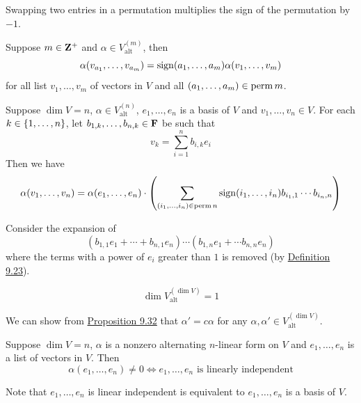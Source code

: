 \documentclass[12pt,a4paper]{article}
\begin{document}
    \begin{prop}
        Swapping two entries in a permutation multiplies the sign of the permutation by $-1$.
    \end{prop}
    \begin{prop}
        Suppose $m\in\mathbf{Z}^+$ and $\alpha\in V_{\mathrm{alt}}^{(m)}$, then
        $$
        \alpha(v_{a_1},\dots,v_{a_m})=\operatorname{sign}(a_1,\dots,a_m)\alpha(v_1,\dots,v_m)
        $$
        for all list $v_1,\dots,v_m$ of vectors in $V$ and all $(a_1,\dots,a_m)\in\operatorname{perm} m$.
    \end{prop}
    \hfill

    \begin{prop}\label{9.32}
        Suppose $\dim V=n$, $\alpha\in V_{\mathrm{alt}}^{(n)}$, $e_1,\dots,e_n$ is a basis of $V$ and $v_1,\dots,v_n\in V$. For each $k\in\left\{1,\dots,n\right\}$, let $b_{1,k},\dots,b_{n,k}\in\mathbf{F}$ be such that 
        $$
        v_k=\sum_{i=1}^nb_{i,k}e_i
        $$
        Then we have
        $$
        \alpha(v_1,\dots,v_n)=\alpha(e_1,\dots,e_n)\cdot\left(\sum_{(i_1,\dots,i_n)\in\operatorname{perm} n}\operatorname{sign}(i_1,\dots,i_n)b_{i_1,1}\cdots b_{i_n,n}\right)
        $$
    \end{prop}
    \begin{remark}
        Consider the expansion of
        $$
        (b_{1,1}e_1+\cdots+b_{n,1}e_n)\cdots(b_{1,n}e_1+\cdots b_{n,n}e_n)
        $$
        where the terms with a power of $e_i$ greater than $1$ is removed (by \hyperref[9.23]{Definition 9.23}).
    \end{remark}
    \hfill

    \begin{prop}
        $$
        \dim V_{\mathrm{alt}}^{(\dim V)}=1
        $$
    \end{prop}
    \begin{remark}
        We can show from \hyperref[9.32]{Proposition 9.32} that $\alpha'=c\alpha$ for any $\alpha,\alpha'\in V_{\mathrm{alt}}^{(\dim V)}$.
    \end{remark}
    \hfill

    \begin{prop}
        Suppose $\dim V=n$, $\alpha$ is a nonzero alternating $n$-linear form on $V$ and $e_1,\dots,e_n$ is a list of vectors in $V$. Then 
        $$
        \alpha(e_1,\dots,e_n)\neq0\iff e_1,\dots,e_n\text{ is linearly independent}
        $$
    \end{prop}
    \begin{remark}
        Note that $e_1,\dots,e_n$ is linear independent is equivalent to $e_1,\dots,e_n$ is a basis of $V$.
    \end{remark}
    \hfill
\end{document}
